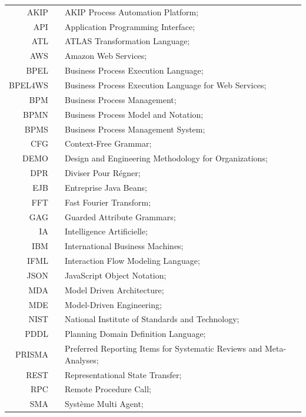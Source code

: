 \begin{center}
	\begin{tabular}[t]{rp{5mm}p{12cm}}
                   AKIP & & AKIP Process Automation Platform;\\
                   API & & Application Programming Interface;\\
                   ATL & & ATLAS Transformation Language;\\
                   AWS & & Amazon Web Services;\\
        BPEL & & Business Process Execution Language; \\
        BPEL4WS & & Business Process Execution Language for Web Services; \\
        BPM & & Business Process Management; \\
        BPMN & & Business Process Model and Notation; \\
        BPMS & & Business Process Management System; \\
        CFG & & Context-Free Grammar;\\
        DEMO & & Design and Engineering Methodology for Organizations;\\
        DPR & & Diviser Pour Régner;\\
        EJB & & Entreprise Java Beans; \\
        FFT & & Fast Fourier Transform;\\
        GAG & & Guarded Attribute Grammars; \\
        IA & & Intelligence Artificielle; \\
        IBM & & International Business Machines; \\
        IFML & & Interaction Flow Modeling Language;\\
        JSON & & JavaScript Object Notation;\\
        MDA & & Model Driven Architecture;\\
        MDE & & Model-Driven Engineering;\\
        NIST & & National Institute of Standards and Technology;\\
        PDDL & & Planning Domain Definition Language; \\
        PRISMA & & Preferred Reporting Items for Systematic Reviews and Meta-Analyses;\\
        REST & & Representational State Transfer; \\
        RPC & & Remote Procedure Call;\\
        SMA & & Système Multi Agent;\\

\end{tabular}
\end{center}
